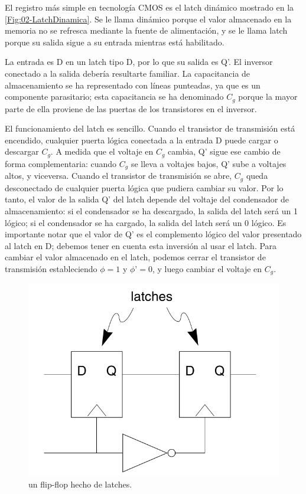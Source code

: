 El registro más simple en tecnología CMOS es el latch dinámico mostrado en la \cref{Fig:02-LatchDinamica}. Se le llama dinámico porque el valor almacenado en la memoria no se refresca mediante la fuente de alimentación, y se le llama latch porque su salida sigue a su entrada mientras está habilitado.



La entrada es D en un latch tipo D, por lo que su salida es Q’. El inversor conectado a la salida debería resultarte familiar. La capacitancia de almacenamiento se ha representado con líneas punteadas, ya que es un componente parasitario; esta capacitancia se ha denominado $C_g$ porque la mayor parte de ella proviene de las puertas de los transistores en el inversor.

El funcionamiento del latch es sencillo. Cuando el transistor de transmisión está encendido, cualquier puerta lógica conectada a la entrada D puede cargar o descargar $C_g$. A medida que el voltaje en $C_g$ cambia, Q’ sigue ese cambio de forma complementaria: cuando $C_g$ se lleva a voltajes bajos, Q’ sube a voltajes altos, y viceversa. Cuando el transistor de transmisión se abre, $C_g$ queda desconectado de cualquier puerta lógica que pudiera cambiar su valor. Por lo tanto, el valor de la salida Q’ del latch depende del voltaje del condensador de almacenamiento: si el condensador se ha descargado, la salida del latch será un 1 lógico; si el condensador se ha cargado, la salida del latch será un 0 lógico. Es importante notar que el valor de Q’ es el complemento lógico del valor presentado al latch en D; debemos tener en cuenta esta inversión al usar el latch. Para cambiar el valor almacenado en el latch, podemos cerrar el transistor de transmisión estableciendo $\phi = 1$ y $\phi’ = 0$, y luego cambiar el voltaje en $C_g$.

\begin{figure}[H] \centering
    \includegraphics[width=0.6\linewidth]{Imagenes/02-FlipFlop.png}
    \caption{un flip-flop hecho de latches.}
    \label{Fig:02-FlipFlop}
\end{figure}

